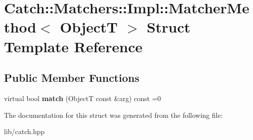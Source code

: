 \hypertarget{struct_catch_1_1_matchers_1_1_impl_1_1_matcher_method}{}\section{Catch\+:\+:Matchers\+:\+:Impl\+:\+:Matcher\+Method$<$ ObjectT $>$ Struct Template Reference}
\label{struct_catch_1_1_matchers_1_1_impl_1_1_matcher_method}
\subsection*{Public Member Functions}
\begin{DoxyCompactItemize}
\item 
\mbox{\label{struct_catch_1_1_matchers_1_1_impl_1_1_matcher_method_ae0920ff9e817acf08e1bb0cbcb044e30}} 
virtual bool {\bfseries match} (ObjectT const \&arg) const =0
\end{DoxyCompactItemize}


The documentation for this struct was generated from the following file\+:\begin{DoxyCompactItemize}
\item 
lib/catch.\+hpp\end{DoxyCompactItemize}
